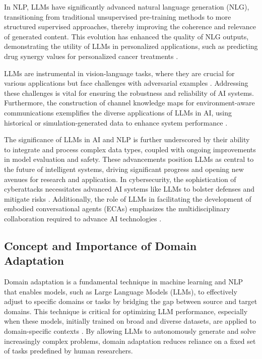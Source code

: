In NLP, LLMs have significantly advanced natural language generation (NLG), transitioning from traditional unsupervised pre-training methods to more structured supervised approaches, thereby improving the coherence and relevance of generated content. This evolution has enhanced the quality of NLG outputs, demonstrating the utility of LLMs in personalized applications, such as predicting drug synergy values for personalized cancer treatments \cite{edwards2023synergptincontextlearningpersonalized}.



LLMs are instrumental in vision-language tasks, where they are crucial for various applications but face challenges with adversarial examples \cite{zhang2024universaladversarialperturbationsvisionlanguage}. Addressing these challenges is vital for ensuring the robustness and reliability of AI systems. Furthermore, the construction of channel knowledge maps for environment-aware communications exemplifies the diverse applications of LLMs in AI, using historical or simulation-generated data to enhance system performance \cite{xu2023dataneededchannelknowledge}.



The significance of LLMs in AI and NLP is further underscored by their ability to integrate and process complex data types, coupled with ongoing improvements in model evaluation and safety. These advancements position LLMs as central to the future of intelligent systems, driving significant progress and opening new avenues for research and application. In cybersecurity, the sophistication of cyberattacks necessitates advanced AI systems like LLMs to bolster defenses and mitigate risks \cite{m2023comparativeanalysisimbalancedmalware}. Additionally, the role of LLMs in facilitating the development of embodied conversational agents (ECAs) emphasizes the multidisciplinary collaboration required to advance AI technologies \cite{korre2023takesvillagemultidisciplinaritycollaboration}.



\subsection{Concept and Importance of Domain Adaptation} \label{subsec:Concept and Importance of Domain Adaptation}



Domain adaptation is a fundamental technique in machine learning and NLP that enables models, such as Large Language Models (LLMs), to effectively adjust to specific domains or tasks by bridging the gap between source and target domains. This technique is critical for optimizing LLM performance, especially when these models, initially trained on broad and diverse datasets, are applied to domain-specific contexts \cite{pandy2024advancementsroboticsprocessautomation}. By allowing LLMs to autonomously generate and solve increasingly complex problems, domain adaptation reduces reliance on a fixed set of tasks predefined by human researchers.



